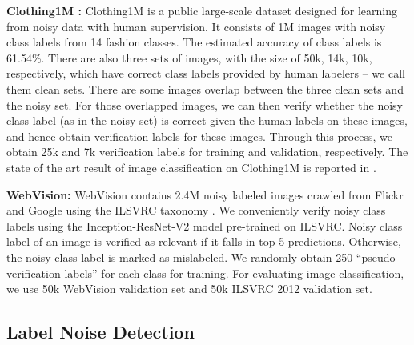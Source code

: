 \documentclass[10pt,twocolumn,letterpaper]{article}
\begin{document}
\noindent
\textbf{Clothing1M \cite{xiao2015learning}:} Clothing1M is a public large-scale dataset designed for learning from noisy data with human supervision. It consists of 1M images with noisy class labels from 14 fashion classes. The estimated accuracy of class labels is 61.54\%. There are also three sets of images, with the size of 50k, 14k, 10k, respectively, which have correct class labels provided by human labelers -- we call them clean sets. There are some images overlap between the three clean sets and the  noisy set. For those overlapped images, we can then verify whether the noisy class label (as in the noisy set) is correct given the human labels on these images, and hence obtain verification labels for these images. Through this process, we obtain 25k and 7k verification labels for training and validation, respectively. The state of the art result of image classification on Clothing1M is reported in \cite{patrini2017making}.

\noindent
\textbf{WebVision\cite{li2017webvision}:} WebVision contains 2.4M noisy labeled images crawled from Flickr and Google using the ILSVRC taxonomy \cite{deng2009imagenet}. We conveniently verify noisy class labels using the Inception-ResNet-V2 model \cite{szegedy2017inception} pre-trained on ILSVRC. Noisy class label of an image is verified as relevant if it falls in top-5 predictions. Otherwise, the noisy class label is marked as mislabeled. We randomly obtain 250 ``pseudo-verification labels'' for each class for training. For evaluating image classification, we use 50k WebVision validation set and 50k ILSVRC 2012 validation set.

\subsection{Label Noise Detection}
\label{subsec:label-noise-detection}
\end{document}
